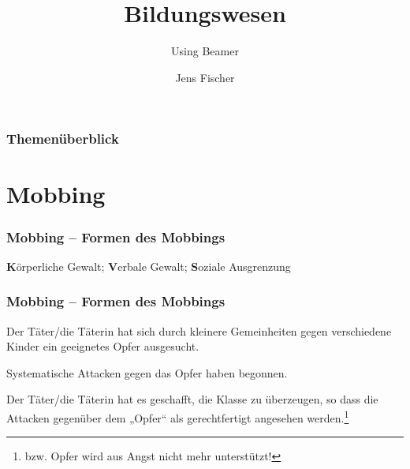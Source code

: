 \documentclass[11pt]{beamer}
\author{Jens Fischer}
\title{Bildungswesen}
\subtitle{Using Beamer}
\begin{document}
	\begin{frame}[plain]
		\maketitle
	\end{frame}

\begin{frame}
	\frametitle{Themenüberblick}
	\tableofcontents
\end{frame}
	
\section{Mobbing}
\begin{frame}
\frametitle{Mobbing -- Formen des Mobbings}
\begin{center}
\end{center}
\begin{center}
	\textbf{K}örperliche Gewalt; \textbf{V}erbale Gewalt; \textbf{S}oziale Ausgrenzung 
\end{center}
\end{frame}

\begin{frame}\frametitle{Mobbing -- Formen des Mobbings}
\begin{description}[noitemsep]\setlength\itemsep{0.3em}
	\item[Phase 1:] Der Täter/die Täterin hat sich durch kleinere Gemeinheiten
	gegen verschiedene Kinder ein geeignetes Opfer ausgesucht.
	\item[Phase 2:] Systematische Attacken gegen das Opfer haben begonnen.
	\item[Phase 3:] Der Täter/die Täterin hat es geschafft, die Klasse zu
	überzeugen, so dass die Attacken gegenüber dem „Opfer“ als
	gerechtfertigt angesehen werden.\footnote{bzw. Opfer wird aus Angst nicht mehr unterstützt!}  
\end{description} 
	
\end{frame}
\end{document}

